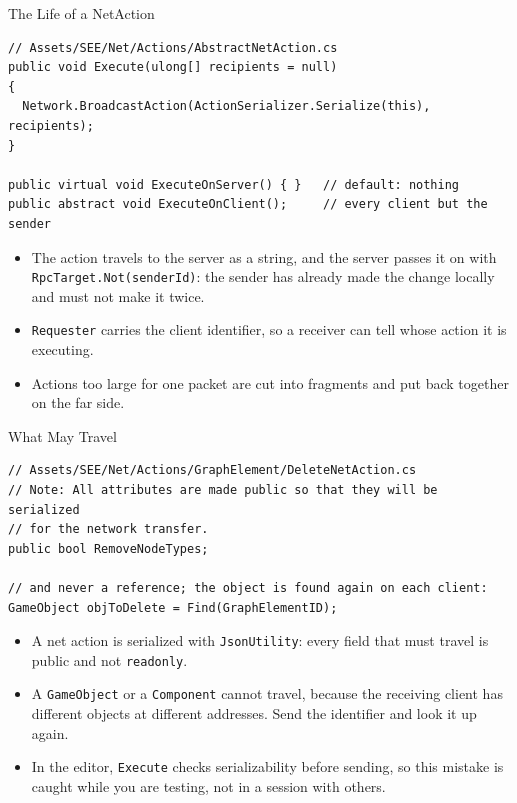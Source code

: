 \begin{frame}[fragile]{The Life of a NetAction}
  \begin{lstlisting}[basicstyle=\scriptsize\ttfamily]
// Assets/SEE/Net/Actions/AbstractNetAction.cs
public void Execute(ulong[] recipients = null)
{
  Network.BroadcastAction(ActionSerializer.Serialize(this), recipients);
}

public virtual void ExecuteOnServer() { }   // default: nothing
public abstract void ExecuteOnClient();     // every client but the sender
  \end{lstlisting}
  \vspace{1ex}

  \begin{itemize}
    \item The action travels to the server as a string, and the server passes
      it on with \texttt{RpcTarget.Not(senderId)}: the sender has already made
      the change locally and must not make it twice.
    \item \texttt{Requester} carries the client identifier, so a receiver can
      tell whose action it is executing.
    \item Actions too large for one packet are cut into fragments and put back
      together on the far side.
  \end{itemize}
\end{frame}

\begin{frame}[fragile]{What May Travel}
  \begin{lstlisting}[basicstyle=\scriptsize\ttfamily]
// Assets/SEE/Net/Actions/GraphElement/DeleteNetAction.cs
// Note: All attributes are made public so that they will be serialized
// for the network transfer.
public bool RemoveNodeTypes;

// and never a reference; the object is found again on each client:
GameObject objToDelete = Find(GraphElementID);
  \end{lstlisting}
  \vspace{1ex}

  \begin{itemize}
    \item A net action is serialized with \texttt{JsonUtility}: every field
      that must travel is public and not \texttt{readonly}.
    \item A \texttt{GameObject} or a \texttt{Component} cannot travel, because
      the receiving client has different objects at different addresses. Send
      the identifier and look it up again.
    \item In the editor, \texttt{Execute} checks serializability before
      sending, so this mistake is caught while you are testing, not in a
      session with others.
  \end{itemize}
\end{frame}

